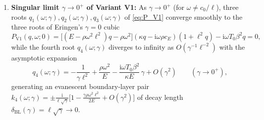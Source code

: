 \begin{theorem}[Mode Count $N=3$ vs.\ $N=4$ and Singular Limit $\gamma \to 0^+$]
\begin{enumerate}[label=(\alph*),leftmargin=*]
\begin{itemize}[leftmargin=*]
    \begin{equation}\label{eq:P_ClassI}
      P_{\mathrm{Class\,I}}(q,\omega;0) := \big[(E - \rho\omega^2\ell^2)q - \rho\omega^2\big](\kappa q - \mathrm{i}\omega\rho c_E) - \mathrm{i}\omega T_0\beta^2 q = 0,
    \end{equation}
    whose leading quadratic coefficient $a_2^{\mathrm{Class\,I}}(\omega;0) = \kappa(E - \rho\omega^2\ell^2)$ changes sign at $\omega_c = c_0/\ell$ ($c_0 := \sqrt{E/\rho}$) and depends explicitly on $\ell$ through the inertia term $(1-\ell^2\partial_x^2)\rho\ddot{u}$.
  \end{itemize}

  \item \textbf{Singular limit $\gamma \to 0^+$ of Variant V1:} As $\gamma \to 0^+$ (for $\omega \neq c_0/\ell$), three roots $q_1(\omega;\gamma), q_2(\omega;\gamma), q_3(\omega;\gamma)$ of \eqref{eq:P_V1} converge smoothly to the three roots of Eringen's $\gamma = 0$ cubic
  \begin{equation}\label{eq:P_V1_gamma0}
    P_{\mathrm{V1}}(q,\omega;0) = \big[(E - \rho\omega^2\ell^2)q - \rho\omega^2\big](\kappa q - \mathrm{i}\omega\rho c_E)(1+\ell^2 q) - \mathrm{i}\omega T_0\beta^2 q = 0,
  \end{equation}
  while the fourth root $q_4(\omega;\gamma)$ diverges to infinity as $O(\gamma^{-1}\ell^{-2})$ with the asymptotic expansion
  \begin{equation}\label{eq:q4_asymptotic}
    q_4(\omega;\gamma) = -\frac{1}{\gamma\ell^2} + \frac{\rho\omega^2}{E} - \frac{\mathrm{i}\omega T_0\beta^2}{\kappa E}\,\gamma + O(\gamma^2) \qquad (\gamma \to 0^+),
  \end{equation}
  generating an evanescent boundary-layer pair $k_4(\omega;\gamma) = \pm\frac{\mathrm{i}}{\ell\sqrt{\gamma}}\big[1 - \frac{\gamma\rho\omega^2\ell^2}{2E} + O(\gamma^2)\big]$ of decay length $\delta_{\mathrm{BL}}(\gamma) = \ell\sqrt{\gamma} \to 0$.


\end{enumerate}
\end{theorem}
